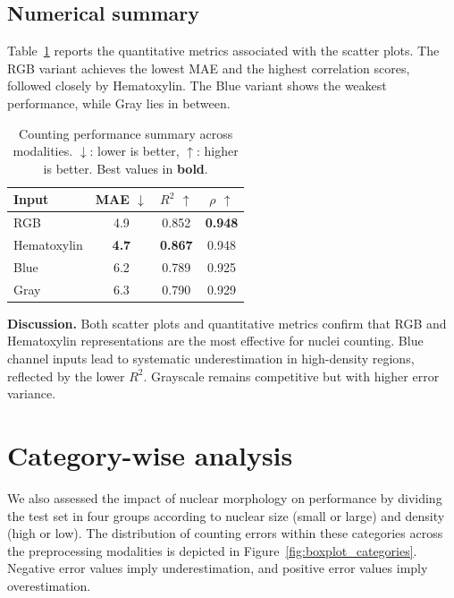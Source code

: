 \documentclass[target=bach,aauheader=,style=]{thud}
\begin{document}
\subsection{Numerical summary}
Table~\ref{tab:counting_results} reports the quantitative metrics associated with the scatter plots. 
The RGB variant achieves the lowest MAE and the highest correlation scores, followed closely by Hematoxylin. 
The Blue variant shows the weakest performance, while Gray lies in between.

\begin{table}[h]
    \centering
    \caption{Counting performance summary across modalities. $\downarrow$: lower is better, $\uparrow$: higher is better. Best values in \textbf{bold}.}
    \label{tab:counting_results}
    \begin{tabular}{lccc}
        \hline
        \textbf{Input} & \textbf{MAE} $\downarrow$ & \textbf{$R^2$} $\uparrow$ & \textbf{$\rho$} $\uparrow$ \\
        \hline
        RGB         & 4.9 & 0.852 & \textbf{0.948} \\
        Hematoxylin & \textbf{4.7}          & \textbf{0.867}          & 0.948 \\
        Blue        & 6.2          & 0.789          & 0.925 \\
        Gray        & 6.3          & 0.790          & 0.929 \\
        \hline
    \end{tabular}
\end{table}

\noindent\textbf{Discussion.} 
Both scatter plots and quantitative metrics confirm that RGB and Hematoxylin representations are the most effective for nuclei counting. 
Blue channel inputs lead to systematic underestimation in high-density regions, reflected by the lower $R^2$. 
Grayscale remains competitive but with higher error variance.

\section{Category-wise analysis} We also assessed the impact of nuclear morphology on performance by dividing the test set in four groups according to nuclear size (small or large) and density (high or low). The distribution of counting errors within these categories across the preprocessing modalities is depicted in Figure~\ref{fig:boxplot_categories}. Negative error values imply underestimation, and positive error values imply overestimation.
\end{document}
